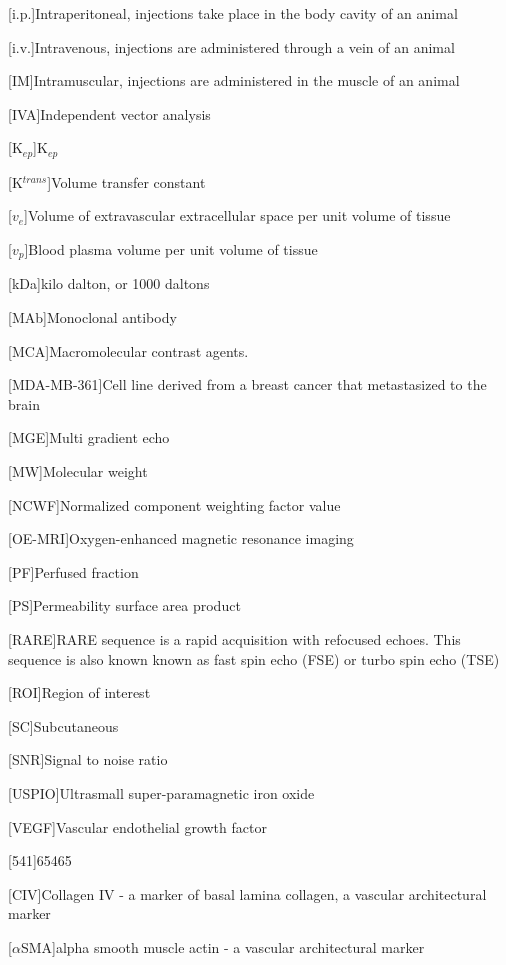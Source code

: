 \begin{acronym}
[i.p.]{Intraperitoneal, injections take place in the body cavity of an animal}

[i.v.]{Intravenous, injections are administered through a vein of an animal}

[IM]{Intramuscular, injections are administered in the muscle of an animal}

[IVA]{Independent vector analysis}

[K$_{ep}$]{K$_{ep}$}

[K$^{trans}$]{Volume transfer constant}

[$v_e$]{Volume of extravascular extracellular space per unit volume of tissue}

[$v_p$]{Blood plasma volume per unit volume of tissue}

[kDa]{kilo dalton, or 1000 daltons}

[MAb]{Monoclonal antibody}

[MCA]{Macromolecular contrast agents.}

[MDA-MB-361]{Cell line derived from a breast cancer that metastasized to the brain}

[MGE]{Multi gradient echo}

[MW]{Molecular weight}

[NCWF]{Normalized component weighting factor value}

[OE-MRI]{Oxygen-enhanced magnetic resonance imaging}

[PF]{Perfused fraction}

[PS]{Permeability surface area product}

[RARE]{RARE sequence is a rapid acquisition with refocused echoes. This sequence is also known known as fast spin echo (FSE) or turbo spin echo (TSE)}

[ROI]{Region of interest}

[SC]{Subcutaneous}

[SNR]{Signal to noise ratio}

[USPIO]{Ultrasmall super-paramagnetic iron oxide}

[VEGF]{Vascular endothelial growth factor}

[541]{65465}

[CIV]{Collagen IV - a marker of basal lamina collagen, a vascular architectural marker}

[$\alpha$SMA]{alpha smooth muscle actin - a vascular architectural marker}


\end{acronym}


